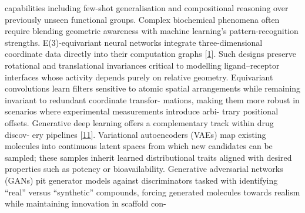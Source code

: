 \documentclass[
]{article}
\begin{document}
capabilities including few-shot generalisation and compositional
reasoning over previously unseen functional groups. Complex biochemical
phenomena often require blending geometric awareness with machine
learning's pattern-recognition strengths. E(3)-equivariant neural
networks integrate three-dimensional coordinate data directly into their
computation graphs {[}\protect\hyperlink{_bookmark41}{1}{]}. Such
designs preserve rotational and translational invariances critical to
modelling ligand--receptor interfaces whose activity depends purely on
relative geometry. Equivariant convolutions learn filters sensitive to
atomic spatial arrangements while remaining invariant to redundant
coordinate transfor- mations, making them more robust in scenarios where
experimental measurements introduce arbi- trary positional offsets.
Generative deep learning offers a complementary track within drug
discov- ery pipelines {[}\protect\hyperlink{_bookmark51}{11}{]}.
Variational autoencoders (VAEs) map existing molecules into continuous
latent spaces from which new candidates can be sampled; these samples
inherit learned distributional traits aligned with desired properties
such as potency or bioavailability. Generative adversarial networks
(GANs) pit generator models against discriminators tasked with
identifying ``real'' versus ``synthetic'' compounds, forcing generated
molecules towards realism while maintaining innovation in scaffold con-
\end{document}
